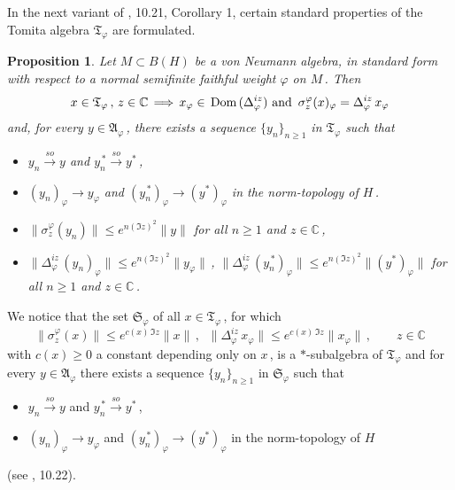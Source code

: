 \documentclass[reqno]{amsart}
\newtheorem{proposition}[theorem]{Proposition}
\theoremstyle{definition}
\theoremstyle{remark}
\numberwithin{equation}{section}
\theoremstyle{plain}
\begin{document}
In the next variant of \cite{S-Z}, 10.21, Corollary 1, certain
standard properties of the Tomita algebra $\mathfrak T_\varphi$
are formulated.
\smallskip

\begin{proposition}\label{Tom}
Let $M\subset B(H)$ be a von Neumann algebra, in standard form with
respect to a normal semifinite faithful weight $\varphi$ on $M\,$.
Then
\begin{equation}\label{intertwin}
x\in\mathfrak T_\varphi\, ,\, z\in\mathbb C\,\Longrightarrow\,
x_\varphi\in\,\text{\rm Dom}\, (\Delta_\varphi^{i z})\text{ and }
\,\sigma^\varphi_z (x)_\varphi =\Delta_\varphi^{i z}\, x_\varphi
\end{equation}
and, for every $y\in\mathfrak A_\varphi\,$, there exists a sequence
$\{ y_n\}_{n\geq 1}$ in $\mathfrak T_\varphi$ such that
\begin{itemize}
\item[--] $y_n\overset{so}{\longrightarrow} y$ and
$y_n^{\, *}\overset{so}{\longrightarrow} y_{}^*\,$,
\item[--] $(y_n)_\varphi\longrightarrow y_\varphi$ and
$(y_n^{\, *})_\varphi\longrightarrow (y_{}^*)_\varphi$ in the
norm-topology of $H\,$.
\item[--] $\| \sigma^\varphi_z (y_n )\|\leq e^{n (\Im z)^2}\| y\|$
for all $n\geq 1$ and $z\in\mathbb C\,$,
\item[--] $\| \Delta_\varphi^{i z}\, (y_n )_\varphi\|\leq
e^{n (\Im z)^2} \| y_\varphi\|\,$, $\| \Delta_\varphi^{i z}\,
(y_n^{\, *})_\varphi\|\leq e^{n (\Im z)^2} \| (y_{}^*)_\varphi\|$
for all $n\geq 1$ and $z\in\mathbb C\,$.
\end{itemize}
\end{proposition}

We notice that the set $\mathfrak S_\varphi$ of all
$x\in\mathfrak T_\varphi\,$, for which
\begin{equation*}
\|\sigma^\varphi_z (x)\|\leq e^{c(x)\,\Im z}\| x\|\, ,\;\; 
\| \Delta_\varphi^{iz}\, x_\varphi\|\leq e^{c(x)\,\Im z}\| x_\varphi\|
\, ,\qquad z\in\mathbb C
\end{equation*}
with $c(x)\geq 0$ a constant depending only on $x\,$, is a
$*$-subalgebra of $\mathfrak T_\varphi$ and for every
$y\in\mathfrak A_\varphi$ there exists a sequence $\{ y_n\}_{n\geq 1}$
in $\mathfrak S_\varphi$ such that
\begin{itemize}
\item[--] $y_n\overset{so}{\longrightarrow} y$ and
$y_n^{\, *}\overset{so}{\longrightarrow} y_{}^*\,$,
\item[--] $(y_n)_\varphi\longrightarrow y_\varphi$ and
$(y_n^{\, *})_\varphi\longrightarrow (y_{}^*)_\varphi$ in the
norm-topology of $H$
\end{itemize}
(see \cite{S-Z}, 10.22).
\end{document}
